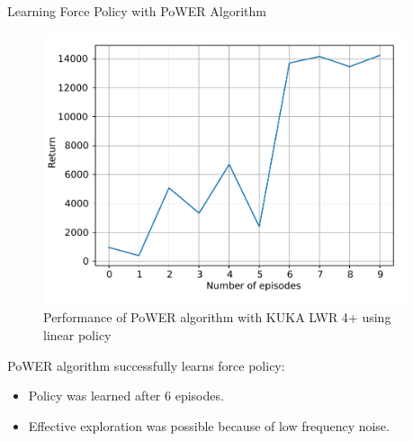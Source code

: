 \documentclass[aspectratio=169]{beamer}
\begin{document}
\begin{frame}
	Learning Force Policy with PoWER Algorithm
	\begin{minipage}[t]{0.51\textwidth}
		\begin{figure}
			\includegraphics[width=0.95\textwidth]{images/exp/cut/power_return1n}
			\caption{\scriptsize Performance of PoWER algorithm with KUKA LWR 4+ using linear policy}
		\end{figure}
	\end{minipage}
	\hfill
	\begin{minipage}[t]{0.47\textwidth}
		\vspace{0.5cm}
		PoWER algorithm successfully learns force policy:
		\begin{itemize}
			\item Policy was learned after 6 episodes.
			\item Effective exploration was possible because of low frequency noise.
		\end{itemize}
	\end{minipage}
\end{frame}
\end{document}
